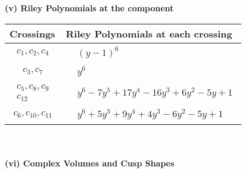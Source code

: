 \documentclass[1p]{elsarticle_modified}
\theoremstyle{definition}
\begin{document}
\newpage\renewcommand{\arraystretch}{1}
\flushleft \textbf{(v) Riley Polynomials at the component}\newline \\
\begin{tabular}{m{50pt}|m{274pt}}
Crossings & \hspace{64pt}Riley Polynomials at each crossing \\
\hline $$\begin{aligned}c_{1},c_{2},c_{4}\end{aligned}$$&$\begin{aligned}
&(y-1)^6
\end{aligned}$\\
\hline $$\begin{aligned}c_{3},c_{7}\end{aligned}$$&$\begin{aligned}
&y^6
\end{aligned}$\\
\hline $$\begin{aligned}c_{5},c_{8},c_{9}\\c_{12}\end{aligned}$$&$\begin{aligned}
&y^6-7 y^5+17 y^4-16 y^3+6 y^2-5 y+1
\end{aligned}$\\
\hline $$\begin{aligned}c_{6},c_{10},c_{11}\end{aligned}$$&$\begin{aligned}
&y^6+5 y^5+9 y^4+4 y^3-6 y^2-5 y+1
\end{aligned}$\\
\hline
\end{tabular}\\~\\
\newpage\flushleft \textbf{(vi) Complex Volumes and Cusp Shapes}
\end{document}
